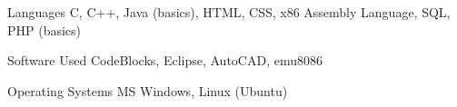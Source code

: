 

\begin{cvskills}

  \cvskill
    {Languages} %
    {C, C++, Java (basics), HTML, CSS, x86 Assembly Language, SQL, PHP (basics)} %

  \cvskill
    {Software Used} %
    {CodeBlocks, Eclipse, AutoCAD, emu8086} %

  \cvskill
    {Operating Systems} %
    {MS Windows, Linux (Ubuntu)} %
    \cvskill
    { } %
    { } %
  \cvskill
    { } %
    { } %
    
     \cvskill
    { } %
    { } %


\end{cvskills}
